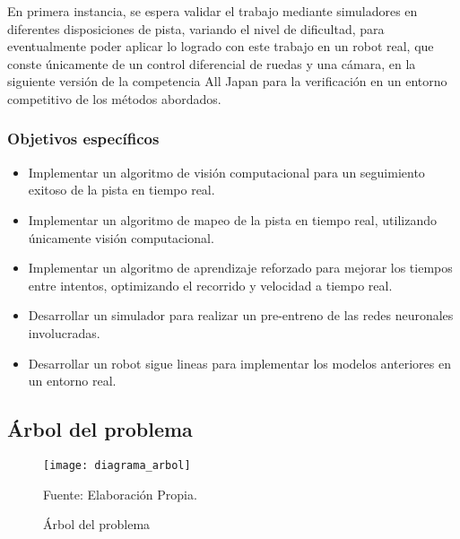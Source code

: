 En primera instancia, se espera validar el trabajo mediante simuladores en diferentes disposiciones de pista, variando el nivel de dificultad, para eventualmente poder aplicar lo logrado con este trabajo en un robot real, que conste únicamente de un control diferencial de ruedas y una cámara, en la siguiente versión de la competencia All Japan para la verificación en un entorno competitivo de los métodos abordados.

\subsubsection{Objetivos específicos}

\begin{itemize}
	\item Implementar un algoritmo de visión computacional para un seguimiento exitoso de la pista en tiempo real.
	\item Implementar un algoritmo de mapeo de la pista en tiempo real, utilizando únicamente visión computacional.
	\item Implementar un algoritmo de aprendizaje reforzado para mejorar los tiempos entre intentos, optimizando el recorrido y velocidad a tiempo real.
	\item Desarrollar un simulador para realizar un pre-entreno de las redes neuronales involucradas.
	\item Desarrollar un robot sigue lineas para implementar los modelos anteriores en un entorno real.
\end{itemize}
\newpage
\subsection{Árbol del problema}

\begin{figure}[h]
\centering
\texttt{[image: diagrama\_arbol]}
\caption{\label{fig:arbol} Árbol del problema} Fuente: Elaboración Propia.
\end{figure}
